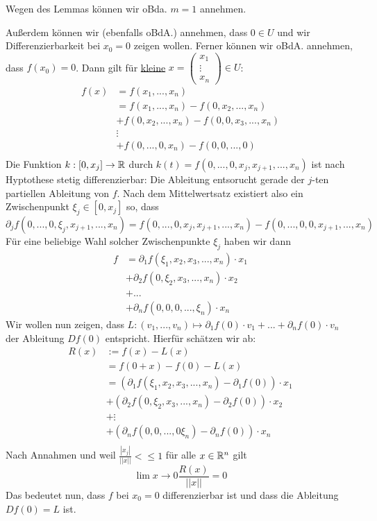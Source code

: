 \documentclass[main.tex]{subfiles}
\begin{document}
\begin{Beweis}
  Wegen des Lemmas können wir oBda. $m = 1$ annehmen.

  Außerdem können wir (ebenfalls oBdA.) annehmen, dass $0 \in U$ und wir Differenzierbarkeit bei $x_0 = 0$ zeigen wollen. Ferner können wir oBdA. annehmen, dass $f(x_0) = 0$. Dann gilt für \underline{kleine} $x = \left(\begin{array}{c} x_1 \\ \vdots \\x_n \end{array}\right) \in U$:
  $$\begin{aligned}
    f(x) & = f(x_1, ..., x_n)\\
    & = f(x_1,...,x_n) - f(0, x_2, ..., x_n) \\
    & + f(0, x_2,...,x_n) - f(0, 0, x_3, ..., x_n) \\
    & \vdots \\
    & + f(0,...,0,x_n) - f(0, 0, ..., 0) \\
  \end{aligned}$$
  Die Funktion $k: [0,x_j] \to \mathbb{R}$ durch $k(t) = f(0,...,0,x_j,x_{j+1},...,x_n)$ ist nach Hyptothese stetig differenzierbar: Die Ableitung entsorucht gerade der $j$-ten partiellen Ableitung von $f$. Nach dem Mittelwertsatz existiert also ein Zwischenpunkt $\xi_j \in [0,x_j]$ so, dass
  $$\partial_j f(0,...,0,\xi_j,x_{j+1},...,x_n) = f(0,...,0,x_j,x_{j+1},...,x_n) - f(0,...,0,0,x_{j+1},...,x_n)$$
  Für eine beliebige Wahl solcher Zwischenpunkte $\xi_j$ haben wir dann
  $$\begin{aligned}
  f & = \partial_1 f(\xi_1,x_2,x_3,...,x_n) \cdot x_1 \\
  & + \partial_2 f(0,\xi_2,x_3,...,x_n) \cdot x_2 \\
  & + ... \\
  & + \partial_n f(0,0,0,...,\xi_n) \cdot x_n
  \end{aligned}$$
  Wir wollen nun zeigen, dass $L: (v_1,...,v_n) \mapsto \partial_1 f(0) \cdot v_1 + ... + \partial_n f(0) \cdot v_n$ der Ableitung $Df(0)$ entspricht. Hierfür schätzen wir ab:
  $$\begin{aligned}
    R(x) & := f(x) - L(x) \\
    & = f(0 + x) -f(0) - L(x) \\
    & = (\partial_1 f(\xi_1, x_2, x_3, ..., x_n) - \partial_1 f(0)) \cdot x_1 \\
    & + (\partial_2 f(0, \xi_2, x_3, ..., x_n) - \partial_2 f(0)) \cdot x_2 \\
    & + \vdots \\
    & + (\partial_n f(0,0,...,0\xi_n) - \partial_n f(0)) \cdot x_n \\
  \end{aligned}$$
  Nach Annahmen und weil $\frac{|x_j|}{||x||} < \leq 1$ für alle $x \in \mathbb{R}^n$ gilt
  $$\lim{x \to 0} \dfrac{R(x)}{||x||} = 0$$
  Das bedeutet nun, dass $f$ bei $x_0 = 0$ differenzierbar ist und dass die Ableitung $Df(0) = L$ ist.
\end{Beweis}
\end{document}
